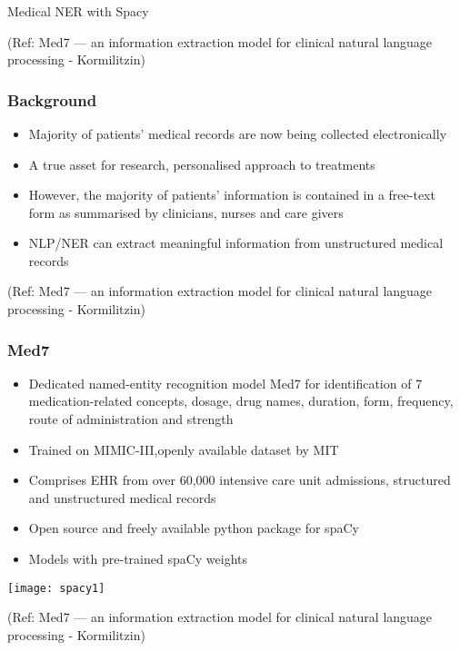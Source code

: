 \begin{frame}[fragile]\frametitle{}

\begin{center}
{\Large Medical NER with Spacy}
\end{center}

{\tiny (Ref: Med7 — an information extraction model for clinical natural language processing - Kormilitzin)}

\end{frame}


\begin{frame}[fragile]\frametitle{Background}
  \begin{itemize}
  \item Majority of patients' medical records are now being collected electronically
	\item A true asset for research, personalised approach to treatments
	\item However, the majority of patients’ information is contained in a free-text form as summarised by clinicians, nurses and care givers
	\item NLP/NER can extract meaningful information from unstructured medical records
  \end{itemize}
	
	{\tiny (Ref: Med7 — an information extraction model for clinical natural language processing - Kormilitzin)}
\end{frame}

\begin{frame}[fragile]\frametitle{Med7}
  \begin{itemize}
  \item Dedicated named-entity recognition model Med7 for identification of 7 medication-related concepts, dosage, drug names, duration, form, frequency, route of administration and strength
	\item Trained on MIMIC-III,openly available dataset by MIT
	\item Comprises EHR from over 60,000 intensive care unit admissions, structured and unstructured medical records
	\item Open source and freely available python package for spaCy
	\item Models with pre-trained spaCy weights
  \end{itemize}
	

\begin{center}
\texttt{[image: spacy1]}
\end{center}

	
	{\tiny (Ref: Med7 — an information extraction model for clinical natural language processing - Kormilitzin)}
\end{frame}


